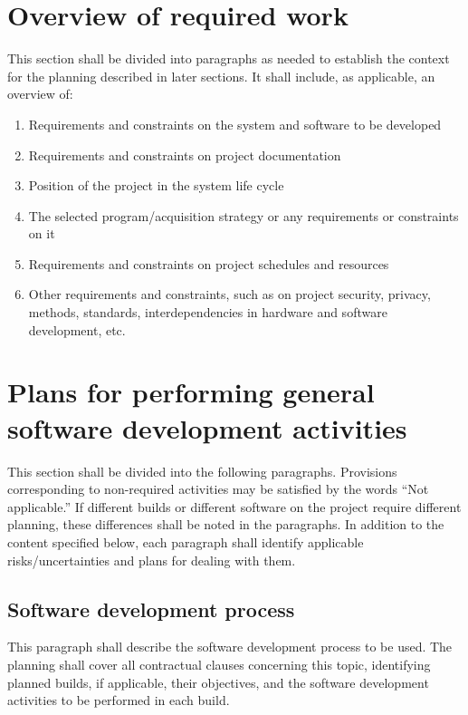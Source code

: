 \documentclass{fidata-report-template}
\begin{document}
\section{Overview of required work}

This section shall be divided into paragraphs as needed to establish the
context for the planning described in later sections. It shall include,
as applicable, an overview of:

\begin{enumerate}
\itemsep1pt\parskip0pt
\item
  Requirements and constraints on the system and software to be
  developed
\item
  Requirements and constraints on project documentation
\item
  Position of the project in the system life cycle
\item
  The selected program/acquisition strategy or any requirements or
  constraints on it
\item
  Requirements and constraints on project schedules and resources
\item
  Other requirements and constraints, such as on project security,
  privacy, methods, standards, interdependencies in hardware and
  software development, etc.
\end{enumerate}

\section{Plans for performing general software development
activities}

This section shall be divided into the following paragraphs. Provisions
corresponding to non-required activities may be satisfied by the words
``Not applicable.'' If different builds or different software on the
project require different planning, these differences shall be noted in
the paragraphs. In addition to the content specified below, each
paragraph shall identify applicable risks/uncertainties and plans for
dealing with them.

\subsection{Software development process}

This paragraph shall describe the software development process to be
used. The planning shall cover all contractual clauses concerning this
topic, identifying planned builds, if applicable, their objectives, and
the software development activities to be performed in each build.
\end{document}
